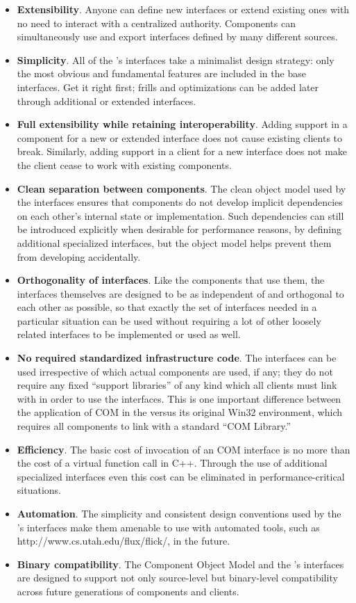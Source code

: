 \begin{itemize}
\item	{\bf Extensibility}.
	Anyone can define new interfaces or extend existing ones
	with no need to interact with a centralized authority.
	Components can simultaneously use and export interfaces
	defined by many different sources.
\item	{\bf Simplicity}.
	All of the \oskit's interfaces
	take a minimalist design strategy:
	only the most obvious and fundamental features
	are included in the base interfaces.
	Get it right first;
	frills and optimizations can be added later
	through additional or extended interfaces.
\item	{\bf Full extensibility while retaining interoperability}.
	Adding support in a component for a new or extended interface
	does not cause existing clients to break.
	Similarly, adding support in a client for a new interface
	does not make the client cease to work with existing components.
\item	{\bf Clean separation between components}.
	The clean object model used by the \oskit{} interfaces
	ensures that components do not develop implicit dependencies
	on each other's internal state or implementation.
	Such dependencies can still be introduced explicitly
	when desirable for performance reasons,
	by defining additional specialized interfaces,
	but the object model helps prevent them from developing accidentally.
\item	{\bf Orthogonality of interfaces}.
	Like the \oskit{} components that use them,
	the interfaces themselves are designed to be
	as independent of and orthogonal to each other as possible,
	so that exactly the set of interfaces needed in a particular situation
	can be used without requiring a lot of other loosely related interfaces
	to be implemented or used as well.
\item	{\bf No required standardized infrastructure code}.
	The \oskit{} interfaces can be used
	irrespective of which actual \oskit{} components are used, if any;
	they do not require any fixed ``support libraries'' of any kind
	which all clients must link with in order to use the interfaces.
	This is one important difference
	between the application of COM in the \oskit{}
	versus its original Win32 environment,
	which requires all components to link with a standard ``COM Library.''
\item	{\bf Efficiency}.
	The basic cost of invocation of an \oskit{} COM interface
	is no more than the cost of a virtual function call in C++.
	Through the use of additional specialized interfaces
	even this cost can be eliminated in performance-critical situations.
\item	{\bf Automation}.
	The simplicity and consistent design conventions
	used by the \oskit's interfaces
	make them amenable to use with automated tools,
	such as %
		{http://www.cs.utah.edu/flux/flick/},
	in the future.
\item	{\bf Binary compatibility}.
	The Component Object Model and the \oskit's interfaces
	are designed to support not only source-level
	but binary-level compatibility
	across future generations of components and clients.
\end{itemize}


